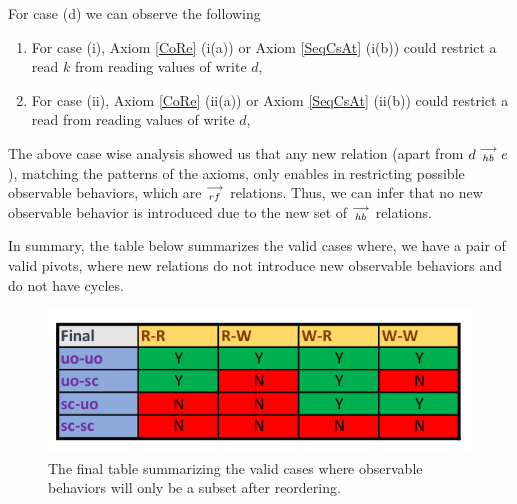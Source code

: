     For case (d) we can observe the following 
    \begin{enumerate}
        \item For case (i), Axiom \ref{CoRe} (i(a)) or Axiom \ref{SeqCsAt} (i(b)) could restrict a read $k$ from reading values of write $d$, 
        \item For case (ii), Axiom \ref{CoRe} (ii(a)) or Axiom \ref{SeqCsAt} (ii(b)) could restrict a read from reading values of write $d$, 
    \end{enumerate}
  
    The above case wise analysis showed us that any new relation (apart from $d\stackrel{\longrightarrow}{_{hb}}e$), matching the patterns of the axioms, only enables in restricting possible observable behaviors, which are $\stackrel{\longrightarrow}{_{rf}}$ relations. Thus, we can infer that no new observable behavior is introduced due to the new set of $\stackrel{\longrightarrow}{_{hb}}$ relations. 
    

    In summary, the table below summarizes the valid cases where, we have a pair of valid pivots, where new relations do not introduce new observable behaviors and do not have cycles. 

    \begin{figure}[H]
        \centering
        \includegraphics[scale=0.7]{InstructionReordering/ValidReorderingProof/part4_table.pdf}
        \caption{The final table summarizing the valid cases where observable behaviors will only be a subset after reordering.}
        \label{fig:my_label}
    \end{figure}

    